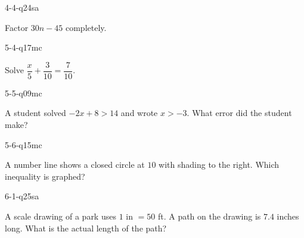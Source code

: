 \begin{practiceQuestion}{4-4-q24}{sa}
\begin{questionText}
Factor $30n - 45$ completely.
\end{questionText}
\end{practiceQuestion}

\begin{practiceQuestion}{5-4-q17}{mc}
\begin{questionText}
Solve $\dfrac{x}{5} + \dfrac{3}{10} = \dfrac{7}{10}$.
\end{questionText}
\end{practiceQuestion}

\begin{practiceQuestion}{5-5-q09}{mc}
\begin{questionText}
A student solved $-2x + 8 > 14$ and wrote $x > -3$. What error did the student make?
\end{questionText}
\end{practiceQuestion}

\begin{practiceQuestion}{5-6-q15}{mc}
\begin{questionText}
A number line shows a closed circle at $10$ with shading to the right. Which inequality is graphed?
\end{questionText}
\end{practiceQuestion}

\begin{practiceQuestion}{6-1-q25}{sa}
\begin{questionText}
A scale drawing of a park uses $1$ in $= 50$ ft. A path on the drawing is $7.4$ inches long. What is the actual length of the path?
\end{questionText}
\end{practiceQuestion}

